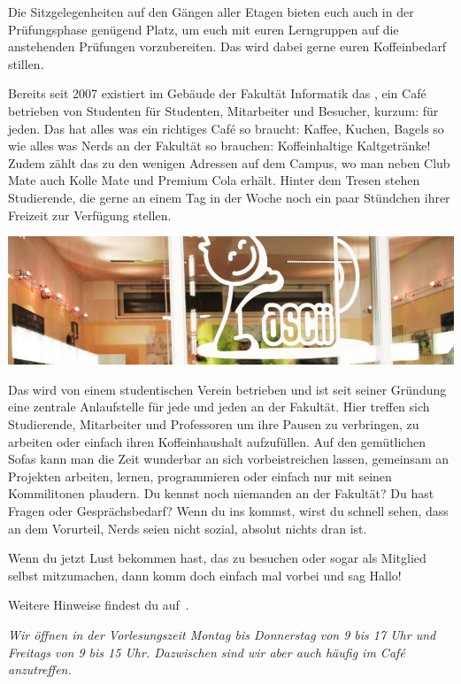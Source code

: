 Die Sitzgelegenheiten auf den Gängen aller Etagen bieten euch auch in der Prüfungsphase genügend Platz, um euch mit euren Lerngruppen auf die anstehenden Prüfungen vorzubereiten. Das \ascii{} wird dabei gerne euren Koffeinbedarf stillen.

\pagebreak


Bereits seit 2007 existiert im Gebäude der Fakultät Informatik das \ascii{}, ein Café betrieben von Studenten für Studenten, Mitarbeiter und Besucher, kurzum: für jeden.
Das \ascii{} hat alles was ein richtiges Café so braucht: Kaffee, Kuchen, Bagels so wie alles was Nerds an der Fakultät so brauchen: Koffeinhaltige Kaltgetränke!
Zudem zählt das \ascii{} zu den wenigen Adressen auf dem Campus, wo man neben Club Mate auch Kolle Mate und Premium Cola erhält.
Hinter dem Tresen stehen Studierende, die gerne an einem Tag in der Woche noch ein paar Stündchen ihrer Freizeit zur Verfügung stellen.

\includegraphics[width=\linewidth]{img/ascii.jpg}

Das \ascii{} wird von einem studentischen Verein betrieben und ist seit seiner Gründung eine zentrale Anlaufstelle für jede und jeden an der Fakultät.
Hier treffen sich Studierende, Mitarbeiter und Professoren um ihre Pausen zu verbringen,
zu arbeiten oder einfach ihren Koffeinhaushalt aufzufüllen.
Auf den gemütlichen Sofas kann man die Zeit wunderbar an sich vorbeistreichen lassen,
gemeinsam an Projekten arbeiten, lernen, programmieren oder einfach nur mit seinen Kommilitonen plaudern.
Du kennst noch niemanden an der Fakultät?
Du hast Fragen oder Gesprächsbedarf?
Wenn du ins \ascii{} kommst, wirst du schnell sehen, dass an dem Vorurteil, Nerds seien nicht sozial, absolut nichts dran ist.

Wenn du jetzt Lust bekommen hast, das \ascii{} zu besuchen oder sogar als Mitglied selbst mitzumachen, dann komm doch einfach mal vorbei und sag Hallo!

Weitere Hinweise findest du auf~.

\textit{Wir öffnen in der Vorlesungszeit Montag bis Donnerstag von 9 bis 17 Uhr und Freitags von 9 bis 15 Uhr. Dazwischen sind wir aber auch häufig im Café anzutreffen.}
